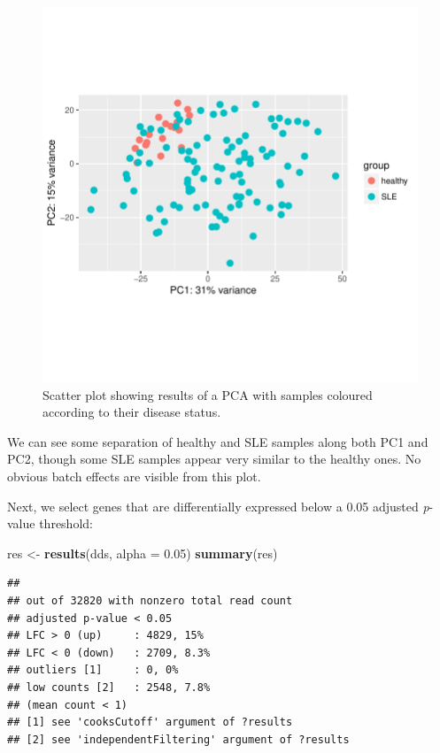 \documentclass[9pt,a4paper,]{extarticle}
\newenvironment{Shaded}{\begin{snugshade}}{\end{snugshade}}
\newcommand{\KeywordTok}[1]{\textcolor[rgb]{0.13,0.29,0.53}{\textbf{#1}}}
\newcommand{\DataTypeTok}[1]{\textcolor[rgb]{0.13,0.29,0.53}{#1}}
\newcommand{\FloatTok}[1]{\textcolor[rgb]{0.00,0.00,0.81}{#1}}
\newcommand{\StringTok}[1]{\textcolor[rgb]{0.31,0.60,0.02}{#1}}
\newcommand{\NormalTok}[1]{#1}
\theoremstyle{definition}
\theoremstyle{definition}
\theoremstyle{definition}
\theoremstyle{remark}
\begin{document}
\begin{figure}

{\centering \includegraphics{biocondutor-regulatory-genomics-workflow_files/figure-latex/figure3-1} 

}

\caption{Scatter plot showing results of a PCA with samples coloured according to their disease status.}\label{fig:figure3}
\end{figure}

We can see some separation of healthy and SLE samples along both PC1 and PC2, though some SLE samples appear very similar to the healthy ones.
No obvious batch effects are visible from this plot.

Next, we select genes that are differentially expressed below a 0.05 adjusted \emph{p}-value threshold:

\begin{Shaded}
\begin{Highlighting}[]
\NormalTok{res <-}\StringTok{ }\KeywordTok{results}\NormalTok{(dds, }\DataTypeTok{alpha =} \FloatTok{0.05}\NormalTok{)}
\KeywordTok{summary}\NormalTok{(res)}
\end{Highlighting}
\end{Shaded}

\begin{verbatim}
## 
## out of 32820 with nonzero total read count
## adjusted p-value < 0.05
## LFC > 0 (up)     : 4829, 15% 
## LFC < 0 (down)   : 2709, 8.3% 
## outliers [1]     : 0, 0% 
## low counts [2]   : 2548, 7.8% 
## (mean count < 1)
## [1] see 'cooksCutoff' argument of ?results
## [2] see 'independentFiltering' argument of ?results
\end{verbatim}
\end{document}
